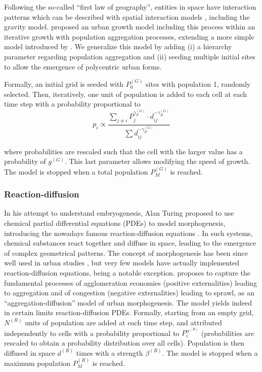 \documentclass[10pt,letterpaper]{article}
\begin{document}

Following the so-called ``first law of geography'', entities in space have interaction patterns which can be described with spatial interaction models \cite{fotheringham1989spatial}, including the gravity model. \cite{li2019singularity} proposed an urban growth model including this process within an iterative growth with population aggregation processes, extending a more simple model introduced by \cite{rybski2013distance}. We generalize this model by adding (i) a hierarchy parameter regarding population aggregation and (ii) seeding multiple initial sites to allow the emergence of polycentric urban forms.

Formally, an initial grid is seeded with $P_0^{(G)}$ sites with population 1, randomly selected. Then, iteratively, one unit of population is added to each cell at each time step with a probability proportional to 
\begin{equation}
p_i \propto \frac{\sum_{j\neq i} P_j^{\gamma_P^{(G)}} \cdot d_{ij}^{- \gamma_D^{(G)}}}{\sum d_{ij}^{- \gamma_D^{(G)}}}
\end{equation}

where probabilities are rescaled such that the cell with the larger value has a probability of $g^{(G)}$. This last parameter allows modifying the speed of growth. The model is stopped when a total population $P_M^{(G)}$ is reached.

\subsubsection*{Reaction-diffusion}


In his attempt to understand embryogenesis, Alan Turing proposed to use chemical partial differential equations (PDEs) to model morphogenesis, introducing the nowadays famous reaction-diffusion equations \cite{turing1990chemical}. In such systems, chemical substances react together and diffuse in space, leading to the emergence of complex geometrical patterns. The concept of morphogenesis has been since well used in urban studies \cite{raimbault2018co}, but very few models have actually implemented reaction-diffusion equations, \cite{bonin2014modelisation} being a notable exception. \cite{10.1371/journal.pone.0203516} proposes to capture the fundamental processes of agglomeration economies (positive externalities) leading to aggregation and of congestion (negative externalities) leading to sprawl, as an ``aggregation-diffusion'' model of urban morphogenesis. The model yields indeed in certain limits reaction-diffusion PDEs. Formally, starting from an empty grid, $N^{(R)}$ units of population are added at each time step, and attributed independently to cells with a probability proportional to $P_i^{\alpha^{(R)}}$ (probabilities are rescaled to obtain a probability distribution over all cells). Population is then diffused in space $d^{(R)}$ times with a strength $\beta^{(R)}$. The model is stopped when a maximum population $P_M^{(R)}$ is reached.
\end{document}
